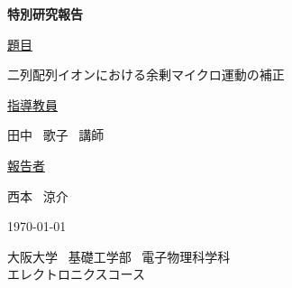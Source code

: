 \begin{titlepage}
	\begin{center}
		\vspace{15truemm}
		{\huge \bf{特別研究報告}\par}
		\vspace{10truemm}
		{\huge \underline{題目}\par}
		\vspace{5truemm}
		{\huge 二列配列イオンにおける余剰マイクロ運動の補正\par}
		\vspace{15truemm}
		{\huge \underline{指導教員}\par}
		\vspace{5truemm}
		{\huge 田中 \ 歌子 \ 講師\par}
		\vspace{15truemm}
		{\huge \underline{報告者}\par}
		\vspace{5truemm}
		{\huge 西本 \ 涼介\par}
		\vspace{15truemm}
		{\huge \today\par}
		\vspace{15truemm}
		{\huge 大阪大学 \ 基礎工学部 \ 電子物理科学科 \\ エレクトロニクスコース}
	\end{center}
\end{titlepage}